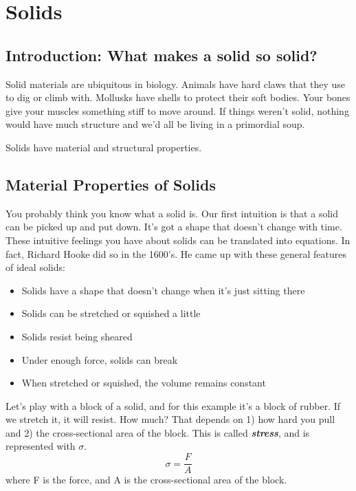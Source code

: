 


\chapter{Solids}
\label{ch:Solids}
\section{Introduction: What makes a solid so solid?}
Solid materials are ubiquitous in biology. Animals have hard claws that they use to dig or climb with. Mollusks have shells to protect their soft bodies. Your bones give your muscles something stiff to move around. If things weren't solid, nothing would have much structure and we'd all be living in a primordial soup.

Solids have material and structural properties.

\section{Material Properties of Solids}

You probably think you know what a solid is. Our first intuition is that a solid can be picked up and put down. It's got a shape that doesn't change with time. These intuitive feelings you have about solids can be translated into equations. In fact, Richard Hooke did so in the 1600's. He came up with these general features of ideal solids: 

\begin{itemize}
\item Solids have a shape that doesn't change when it's just sitting there
\item Solids can be stretched or squished a little
\item Solids resist being sheared
\item Under enough force, solids can break
\item When stretched or squished, the volume remains constant
\end{itemize}

Let's play with a block of a solid, and for this example it's a block of rubber. If we stretch it, it will resist. How much? That depends on 1) how hard you pull and 2) the cross-sectional area of the block. This is called \emph{\textbf{stress}}, and is represented with $\sigma$.
\begin{equation}
\sigma = \frac{F}{A}
\end{equation}
where F is the force, and A is the cross-sectional area of the block.

